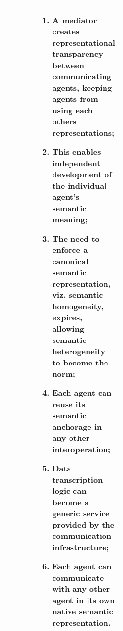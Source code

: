 \begin{xltabular}[l]{\linewidth}{@{} >{\small\raggedright\arraybackslash}p{0.47\linewidth} >{\small\raggedright\arraybackslash}X @{}}
\begin{enumerate}[left=6pt, nosep]
\end{enumerate}
&
\begin{enumerate}[left=10pt, nosep]
  \item A mediator creates representational transparency between communicating agents, keeping agents from using each others representations;
  \item This enables independent development of the individual agent’s semantic meaning;
  \item The need to enforce a canonical semantic representation, viz. semantic homogeneity, expires, allowing semantic heterogeneity to become the norm;
  \item Each agent can reuse its semantic anchorage in any other interoperation;
  \item Data transcription logic can become a generic service provided by the communication infrastructure;
  \item Each agent can communicate with any other agent in its own native semantic representation.
\end{enumerate}\\
%
\bottomrule
\end{xltabular}

